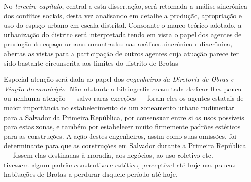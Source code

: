 No \textit{terceiro capítulo}, central a esta dissertação, será retomada a análise sincrônica dos conflitos sociais, desta vez analisando em detalhe a produção, apropriação e uso do espaço urbano em escala distrital. Consoante o marco teórico adotado, a urbanização do distrito será interpretada tendo em vista o papel dos agentes de produção do espaço urbano encontrados nas análises sincrônica e diacrônica, abertas as vistas para a participação de outros agentes cuja atuação parece ter sido bastante circunscrita aos limites do distrito de Brotas.

Especial atenção será dada ao papel dos \textit{engenheiros da Diretoria de Obras e Viação do município}. Não obstante a bibliografia consultada dedicar-lhes pouca ou nenhuma atenção --- salvo raras exceções \cite{almeida_victoria_1997, almeida_vitrinescomercio_2014, cardoso1990proleta, cardoso_vilas_1991} --- foram eles os agentes estatais de maior importância no estabelecimento de um zoneamento urbano rudimentar para a Salvador da Primeira República, por consensuar entre si os usos possíveis para estas zonas, e também por estabelecer muito firmemente padrões estéticos para as construções. A ação destes engenheiros, assim como suas omissões, foi determinante para que as construções em Salvador durante a Primeira República --- fossem elas destinadas à moradia, aos negócios, ao uso coletivo etc. --- tivessem algum padrão construtivo e estético, perceptível até hoje nas poucas habitações de Brotas a perdurar daquele período até hoje.

